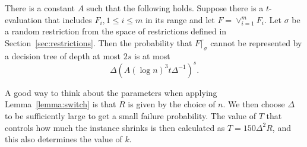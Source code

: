\documentclass{theoretics}
\begin{document}
\begin{lemma} \label{lemma:switch}
There is a constant $A$ such that the
following holds.
Suppose there is a $t$-evaluation that includes $F_i, 1\leq i \leq m$
in its range and let $F =  \lor_{i=1}^m F_i$.
Let $\sigma$ be a random restriction from the 
space of restrictions defined in Section~\ref{sec:restrictions}.
Then the probability that $F\lceil_\sigma$
cannot be represented by a decision tree of depth at most $2s$
is at most
$$
\Delta (A(\log n)^{3} t \Delta^{-1})^{s}.$$
\end{lemma}

\begin{remark}
A good way to think about the parameters when applying 
Lemma~\ref{lemma:switch} is that $R$ is given
by the choice of $n$.  We then choose $\Delta$ to
be sufficiently large to get a small failure probability.
The value of $T$ that controls how much the instance
shrinks is then calculated as $T= 150 \Delta^2 R$,
and this also determines the value of $k$.
\end{remark}
\end{document}
